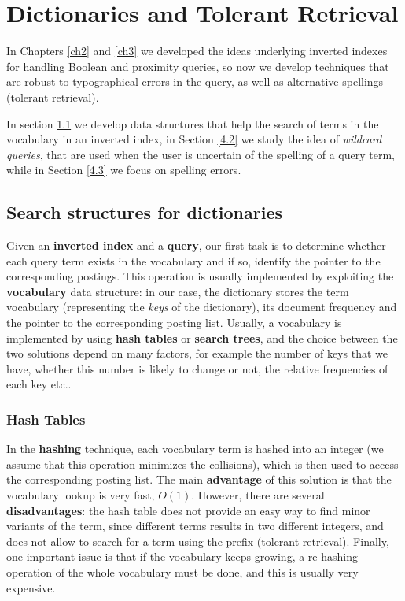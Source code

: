 \section{Dictionaries and Tolerant Retrieval}\label{ch4}
In Chapters \ref{ch2} and \ref{ch3} we developed the ideas underlying inverted indexes for handling Boolean and proximity queries, so now we develop techniques that are robust to typographical errors in the query, as well as alternative spellings (tolerant retrieval).

In section \ref{4.1} we develop data structures that help the search of terms in the vocabulary in an inverted index, in Section \ref{4.2} we study the idea of \textit{wildcard queries}, that are used when the user is uncertain of the spelling of a query term, while in Section \ref{4.3} we focus on spelling errors.

\subsection{Search structures for dictionaries}\label{4.1}
Given an \textbf{inverted index} and a \textbf{query}, our first task is to determine whether each query term exists in the vocabulary and if so, identify the pointer to the corresponding postings. This operation is usually implemented by exploiting the \textbf{vocabulary} data structure: in our case, the dictionary stores the term vocabulary (representing the \textit{keys} of the dictionary), its document frequency and the pointer to the corresponding posting list. Usually, a vocabulary is implemented by using \textbf{hash tables} or \textbf{search trees}, and the choice between the two solutions depend on many factors, for example the number of keys that we have, whether this number is likely to change or not, the relative frequencies of each key etc..

\subsubsection{Hash Tables}
In the \textbf{hashing} technique, each vocabulary term is hashed into an integer (we assume that this operation minimizes the collisions), which is then used to access the corresponding posting list. The main \textbf{advantage} of this solution is that the vocabulary lookup is very fast, $O(1)$. However, there are several \textbf{disadvantages}: the hash table does not provide an easy way to find minor variants of the term, since different terms results in two different integers, and does not allow to search for a term using the prefix (tolerant retrieval). Finally, one important issue is that if the vocabulary keeps growing, a re-hashing operation of the whole vocabulary must be done, and this is usually very expensive.

